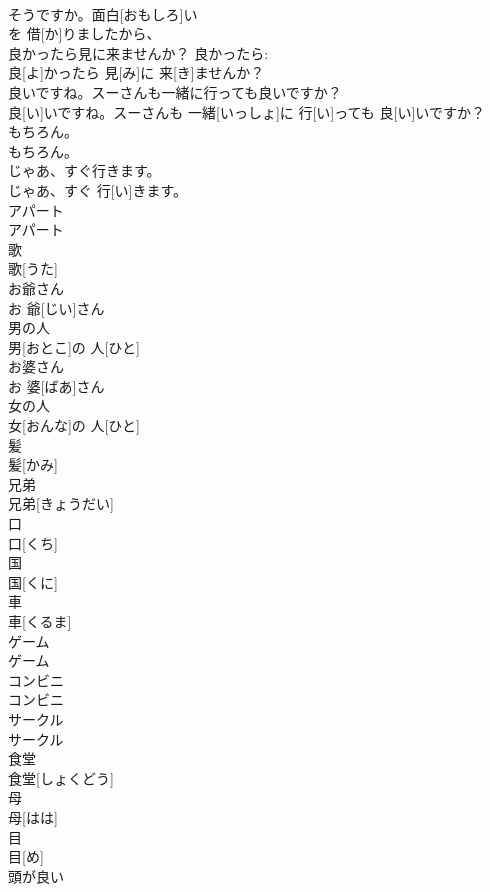 \documentclass[8pt]{extreport}
\begin{document}
\begin{CJK}{UTF8}{min}
\\	そうですか。面白[おもしろ]い 
\\	を 借[か]りましたから、	
\\	良かったら見に来ませんか？	良かったら: 
\\	良[よ]かったら 見[み]に 来[き]ませんか？	
\\	良いですね。スーさんも一緒に行っても良いですか？	
\\	良[い]いですね。スーさんも 一緒[いっしょ]に 行[い]っても 良[い]いですか？	
\\	もちろん。	
\\	もちろん。		
\\	じゃあ、すぐ行きます。	
\\	じゃあ、すぐ 行[い]きます。		
\\	アパート	
\\	アパート		
\\	歌	
\\	歌[うた]		
\\	お爺さん	
\\	お 爺[じい]さん		
\\	男の人	
\\	男[おとこ]の 人[ひと]		
\\	お婆さん	
\\	お 婆[ばあ]さん		
\\	女の人	
\\	女[おんな]の 人[ひと]		
\\	髪	
\\	髪[かみ]		
\\	兄弟	
\\	兄弟[きょうだい]		
\\	口	
\\	口[くち]		
\\	国	
\\	国[くに]		
\\	車	
\\	車[くるま]		
\\	ゲーム	
\\	ゲーム		
\\	コンビニ	
\\	コンビニ		
\\	サークル	
\\	サークル		
\\	食堂	
\\	食堂[しょくどう]		
\\	母	
\\	母[はは]		
\\	目	
\\	目[め]		
\\	頭が良い	

\end{CJK}
\end{document}
